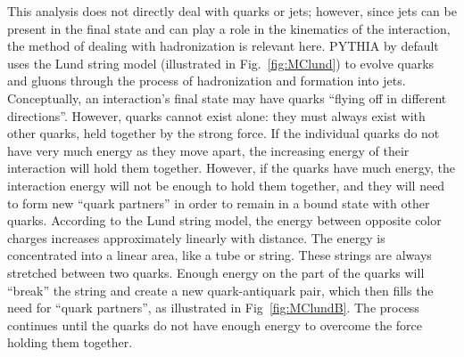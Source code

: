 This analysis does not directly deal with 
quarks or jets; 
however, since jets can be present in the final state 
and can play a role in the kinematics of the \Zee 
interaction, 
the method of dealing with hadronization 
is relevant here.  
PYTHIA by default uses the Lund string model 
(illustrated in Fig.~\ref{fig:MClund})
to evolve 
quarks and gluons through the process of hadronization 
and formation into jets. %
Conceptually, an interaction's final state may have 
quarks 
``flying off in different directions''.  
However, quarks cannot exist alone: %
they must always exist with other quarks, 
held together by the strong force.  
If the individual quarks do not have very much energy 
as they move apart, 
the increasing energy of their interaction 
will hold them together.  %
However, if the quarks have much energy, 
the interaction energy will not be enough to hold 
them together, 
and they will need to form new ``quark partners'' 
in order to 
remain in a bound state with other quarks.  
According to the Lund string model, 
the energy between opposite color charges 
increases approximately linearly with distance. 
The energy is concentrated into a linear area, 
like a tube or string.  
These strings are always stretched between two quarks.  
Enough energy on the part of the quarks will 
``break'' the string and 
create a new quark-antiquark pair, 
which then fills the need for ``quark partners'', 
as illustrated in Fig~\ref{fig:MClundB}.  
The process continues until the quarks 
do not have enough energy to overcome 
the force holding them together.  %


